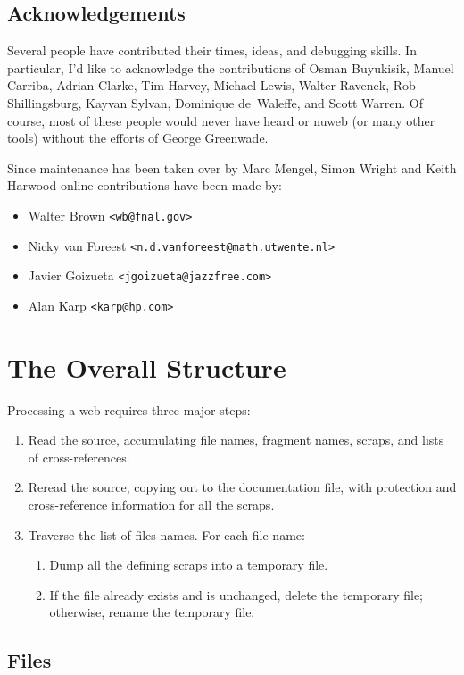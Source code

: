 \documentclass[a4paper]{report}
\newif\ifshowcode
\begin{document}
\section{Acknowledgements}

Several people have contributed their times, ideas, and debugging
skills. In particular, I'd like to acknowledge the contributions of
Osman Buyukisik, Manuel Carriba, Adrian Clarke, Tim Harvey, Michael
Lewis, Walter Ravenek, Rob Shillingsburg, Kayvan Sylvan, Dominique
de~Waleffe, and Scott Warren.  Of course, most of these people would
never have heard or nuweb (or many other tools) without the efforts of
George Greenwade.

Since maintenance has been taken over by Marc Mengel, Simon Wright and
Keith Harwood online contributions have been made by:
\begin{itemize}
\item Walter Brown \verb|<wb@fnal.gov>|
\item Nicky van Foreest \verb|<n.d.vanforeest@math.utwente.nl>|
\item Javier Goizueta \verb|<jgoizueta@jazzfree.com>|
\item Alan Karp \verb|<karp@hp.com>|
\end{itemize}

\ifshowcode
\chapter{The Overall Structure}

Processing a web requires three major steps:
\begin{enumerate}
  \item Read the source, accumulating file names, fragment names, scraps,
    and lists of cross-references.
  \item Reread the source, copying out to the documentation file, with
    protection and cross-reference information for all the scraps.
  \item Traverse the list of files names. For each file name:
  \begin{enumerate}
    \item Dump all the defining scraps into a temporary file.
    \item If the file already exists and is unchanged, delete the
      temporary file; otherwise, rename the temporary file.
  \end{enumerate}
\end{enumerate}


\section{Files}
\end{document}

